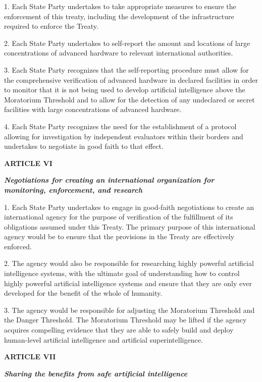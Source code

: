\documentclass[12pt,a4paper]{article}
\begin{document}
1. Each State Party undertakes to take appropriate measures to ensure the enforcement of this treaty, including the development of the infrastructure required to enforce the Treaty.

2. Each State Party undertakes to self-report the amount and locations of large concentrations of advanced hardware to relevant international authorities. 

3. Each State Party recognizes that the self-reporting procedure must allow for the comprehensive verification of advanced hardware in declared facilities in order to monitor that it is not being used to develop artificial intelligence above the Moratorium Threshold and to allow for the detection of any undeclared or secret facilities with large concentrations of advanced hardware.

4. Each State Party recognizes the need for the establishment of a protocol allowing for investigation by independent evaluators within their borders and undertakes to negotiate in good faith to that effect. 

\begin{center}
    
\textbf{{ARTICLE VI}}

\textbf{\textit{Negotiations for creating an international organization for monitoring, enforcement, and research }}
\end{center}


1. Each State Party undertakes to engage in good-faith negotiations to create an international agency for the purpose of verification of the fulfillment of its obligations assumed under this Treaty. The primary purpose of this international agency would be to ensure that the provisions in the Treaty are effectively enforced. 

2. The agency would also be responsible for researching highly powerful artificial intelligence systems, with the ultimate goal of understanding how to control highly powerful artificial intelligence systems and ensure that they are only ever developed for the benefit of the whole of humanity. 

3. The agency would be responsible for adjusting the Moratorium Threshold and the Danger Threshold. The Moratorium Threshold may be lifted if the agency acquires compelling evidence that they are able to safely build and deploy human-level artificial intelligence and artificial superintelligence. 

 \begin{center}
    
\textbf{{ARTICLE VII}}

\textbf{\textit{\textit{\textbf{\textit{\textbf{Sharing the benefits from safe artificial intelligence}} }}}}
\end{center}
\end{document}
